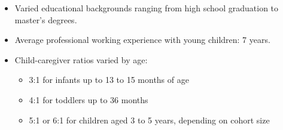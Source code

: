 \documentclass[static]{JJH-Beamer}
\begin{document}

\begin{itemize}
\item Varied educational backgrounds ranging from high school graduation to master's degrees.
\item Average professional working experience with young children: 7 years.
\item Child-caregiver ratios varied by age:
    \begin{itemize}
    \item 3:1 for infants up to 13 to 15 months of age
    \item 4:1 for toddlers up to 36 months
    \item 5:1 or 6:1 for children aged 3 to 5 years, depending on cohort size
    \end{itemize}
\end{itemize}
\end{document}
